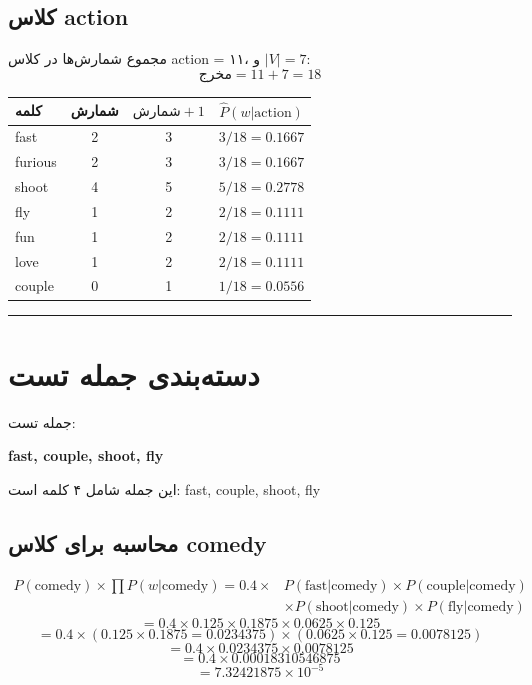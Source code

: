 \documentclass[11pt,a4paper]{article}
\newcommand{\en}[1]{\textenglish{#1}}
\newcommand{\separator}{\vspace{1em}\noindent\rule{\linewidth}{0.4pt}\vspace{1em}}
\begin{document}
\subsection*{کلاس \en{action}}
مجموع شمارش‌ها در کلاس \en{action} = ۱۱، و $|V| = 7$:
\[
\text{مخرج} = 11 + 7 = 18
\]

\begin{center}
\begin{tabular}{|l|c|c|c|}
\hline
\textbf{کلمه} & \textbf{شمارش} & $\text{شمارش} + 1$ & $\hat{P}(w|\text{action})$ \\
\hline
\en{fast} & 2 & 3 & $3/18 = 0.1667$ \\
\hline
\en{furious} & 2 & 3 & $3/18 = 0.1667$ \\
\hline
\en{shoot} & 4 & 5 & $5/18 = 0.2778$ \\
\hline
\en{fly} & 1 & 2 & $2/18 = 0.1111$ \\
\hline
\en{fun} & 1 & 2 & $2/18 = 0.1111$ \\
\hline
\en{love} & 1 & 2 & $2/18 = 0.1111$ \\
\hline
\en{couple} & 0 & 1 & $1/18 = 0.0556$ \\
\hline
\end{tabular}
\end{center}

\separator
\section{دسته‌بندی جمله تست}
جمله تست:
\begin{center}
\textbf{\en{fast, couple, shoot, fly}}
\end{center}

این جمله شامل ۴ کلمه است: \en{fast, couple, shoot, fly}

\subsection*{محاسبه برای کلاس \en{comedy}}
\[
\begin{aligned}
P(\text{comedy}) \times \prod P(w|\text{comedy}) = 0.4 \times & P(\text{fast}|\text{comedy}) \times P(\text{couple}|\text{comedy}) \\
& \times P(\text{shoot}|\text{comedy}) \times P(\text{fly}|\text{comedy})
\end{aligned}
\]
\[
= 0.4 \times 0.125 \times 0.1875 \times 0.0625 \times 0.125
\]
\[
= 0.4 \times (0.125 \times 0.1875 = 0.0234375) \times (0.0625 \times 0.125 = 0.0078125)
\]
\[
= 0.4 \times 0.0234375 \times 0.0078125
\]
\[
= 0.4 \times 0.00018310546875
\]
\[
= 7.32421875 \times 10^{-5}
\]
\end{document}
